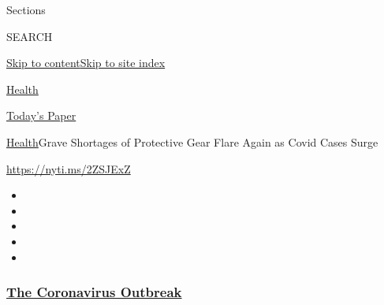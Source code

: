 Sections

SEARCH

\protect\hyperlink{site-content}{Skip to
content}\protect\hyperlink{site-index}{Skip to site index}

\href{https://www.nytimes3xbfgragh.onion/section/health}{Health}

\href{https://myaccount.nytimes3xbfgragh.onion/auth/login?response_type=cookie\&client_id=vi}{}

\href{https://www.nytimes3xbfgragh.onion/section/todayspaper}{Today's
Paper}

\href{/section/health}{Health}\textbar{}Grave Shortages of Protective
Gear Flare Again as Covid Cases Surge

\url{https://nyti.ms/2ZSJExZ}

\begin{itemize}
\item
\item
\item
\item
\item
\end{itemize}

\hypertarget{the-coronavirus-outbreak}{%
\subsubsection{\texorpdfstring{\href{https://www.nytimes3xbfgragh.onion/news-event/coronavirus?name=styln-coronavirus-national\&region=TOP_BANNER\&block=storyline_menu_recirc\&action=click\&pgtype=Article\&impression_id=97a76520-f2d4-11ea-b9d1-d10fb06eae1c\&variant=undefined}{The
Coronavirus
Outbreak}}{The Coronavirus Outbreak}}\label{the-coronavirus-outbreak}}


